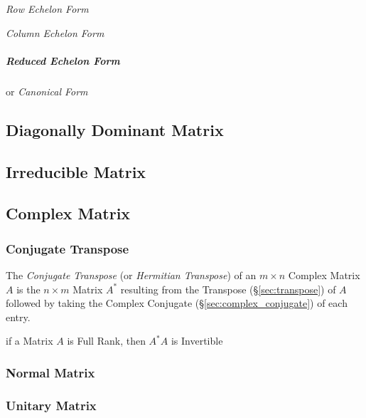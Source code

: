 \emph{Row Echelon Form}

\emph{Column Echelon Form}



\subparagraph{Reduced Echelon Form}\label{sec:reduced_echelon}\hfill

or \emph{Canonical Form}



\subsection{Diagonally Dominant Matrix}\label{sec:diagonally_dominant}

\subsection{Irreducible Matrix}\label{sec:irreducible_matrix}

\subsection{Complex Matrix}\label{sec:complex_matrix}

\subsubsection{Conjugate Transpose}\label{sec:conjugate_transpose}

The \emph{Conjugate Transpose} (or \emph{Hermitian Transpose}) of an $m \times
n$ Complex Matrix $A$ is the $n \times m$ Matrix $A^*$ resulting from the
Transpose (\S\ref{sec:transpose}) of $A$ followed by taking the Complex
Conjugate (\S\ref{sec:complex_conjugate}) of each entry.

if a Matrix $A$ is Full Rank, then $A^*A$ is Invertible



\subsubsection{Normal Matrix}\label{sec:normal_matrix}

\subsubsection{Unitary Matrix}\label{sec:unitary_matrix}

